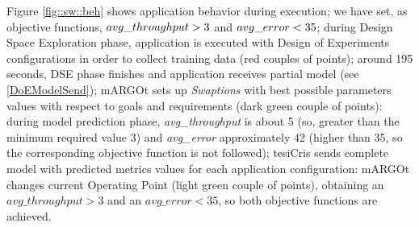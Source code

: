 Figure \ref{fig::sw::beh} shows application behavior during execution; we have set, as objective functions, $avg\_\-throughput > 3$ and $avg\_\-error < 35$; during Design Space Exploration phase, application is executed with Design of Experiments configurations in order to collect training data (red couples of points); around 195 seconds, DSE phase finishes and application receives partial model (see \ref{DoEModelSend}); mARGOt sets up \textit{Swaptions} with best possible parameters values with respect to goals and requirements (dark green couple of points): during model prediction phase, \textit{avg\_throughput} is about 5 (so, greater than the minimum required value 3) and \textit{avg\_error} approximately 42 (higher than 35, so the corresponding objective function is not followed); tesiCris sends complete model with predicted metrics values for each application configuration: mARGOt changes current Operating Point (light green couple of points), obtaining an $avg\_throughput > 3$ and an $avg\_error < 35$, so both objective functions are achieved. 
